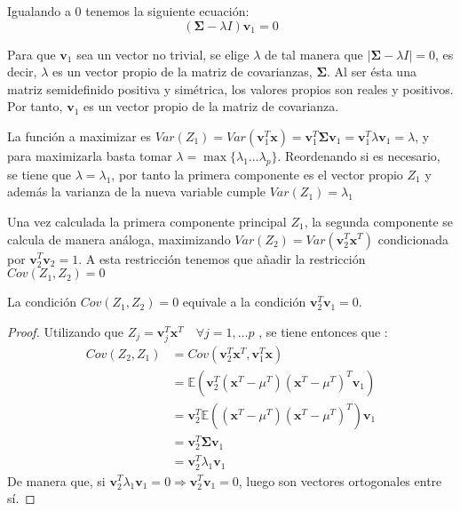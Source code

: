 \noindent Igualando a 0 tenemos la siguiente ecuación: 
\begin{equation}
(\mathbf{\Sigma}-\lambda I)\textbf{v}_1=0
\end{equation}

\noindent Para que $\textbf{v}_1$ sea un vector no trivial, se elige $\lambda$ de tal manera que $|\mathbf{\Sigma}-\lambda I| = 0$, es decir, $\lambda$ es un vector propio de la matriz de covarianzas, $\mathbf{\Sigma}$. Al ser ésta una matriz semidefinido positiva y simétrica, los valores propios son reales y positivos. Por tanto, $\textbf{v}_1$ es un vector propio de la matriz de covarianza.

\noindent La función a maximizar es $Var(Z_1)=Var(\textbf{v}_1^T\textbf{x})=\textbf{v}_1^T\mathbf{\Sigma} \textbf{v}_1=\textbf{v}_1^T\lambda \textbf{v}_1=\lambda$, y para maximizarla basta tomar $\lambda=\max{\lbrace\lambda_1\ldots \lambda_p\rbrace}$. Reordenando si es necesario, se tiene que $\lambda=\lambda_1$, por tanto la primera componente es el vector propio $Z_1$ y además la varianza de la nueva variable cumple $Var(Z_1)=\lambda_1$ 

\noindent Una vez calculada la primera componente principal $Z_1$, la segunda componente se calcula de manera análoga, maximizando $Var(Z_2)=Var(\textbf{v}_2^T\textbf{x}^T)$ condicionada por $\textbf{v}_2^T\textbf{v}_2=1$. A esta restricción tenemos que añadir la restricción $Cov(Z_1,Z_2)=0 $

\begin{propo}
La condición $Cov(Z_1,Z_2)=0 $ equivale a la condición $\textbf{v}_2^T\textbf{v}_1 = 0$.
\begin{proof}
Utilizando que $Z_j=\textbf{v}_j^T \textbf{x}^T \quad \forall j=1,\ldots p$ , se tiene entonces que :
\begin{align*}
Cov(Z_2,Z_1)&= Cov (\textbf{v}_2^T\mathbf{x}^T,\mathbf{v}_1^T\mathbf{x})\\ 
&= \mathbb{E}(\mathbf{v}_2^T(\mathbf{x}^T-\mu^T)(\mathbf{x}^T-\mu^T)^T \mathbf{v}_1)\\
&= \textbf{v}_2^T \mathbb{E}((\textbf{x}^T-\mu^T)(\mathbf{x}^T-\mu^T)^T) \textbf{v}_1\\
&= \textbf{v}_2^T \mathbf{\Sigma} \textbf{v}_1 \\
&= \textbf{v}_2^T \lambda_1 \textbf{v}_1
\end{align*}
\noindent De manera que, si $\mathbf{v}_2^T \lambda_1 \mathbf{v}_1 = 0 \Rightarrow \mathbf{v}_2^T \mathbf{v}_1=0 $, luego son vectores ortogonales entre sí.
\end{proof}
\end{propo}


